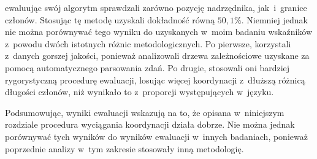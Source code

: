 \cite{przepiorkowski2024argument} ewaluując swój algorytm sprawdzali zarówno pozycję nadrzędnika, jak~i~granice członów. Stosując tę metodę uzyskali dokładność równą $50{,}1\%$. Niemniej jednak nie można porównywać tego wyniku do uzyskanych w~moim badaniu wskaźników z~powodu dwóch istotnych różnic metodologicznych. Po pierwsze, \cite{przepiorkowski2024argument} korzystali z~danych gorszej jakości, ponieważ analizowali drzewa zależnościowe uzyskane za pomocą automatycznego parsowania zdań. Po drugie, stosowali oni bardziej rygorystyczną procedurę ewaluacji, losując więcej koordynacji z~dłuższą różnicą długości członów, niż wynikało to z~proporcji występujących w~języku.

Podsumowując, wyniki ewaluacji wskazują na to, że opisana w~niniejszym rozdziale procedura wyciągania koordynacji działa dobrze. Nie można jednak porównywać tych wyników do wyników ewaluacji w~innych badaniach, ponieważ poprzednie analizy w~tym zakresie stosowały inną metodologię.